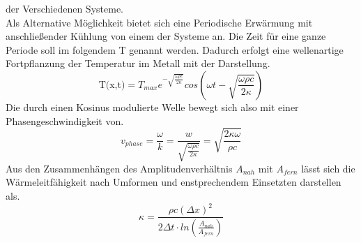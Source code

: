 der Verschiedenen Systeme.
\\
\newline
Als Alternative Möglichkeit bietet sich eine Periodische Erwärmung mit anschließender Kühlung von einem der Systeme an.
Die Zeit für eine ganze Periode soll im folgendem T genannt werden.
Dadurch erfolgt eine wellenartige Fortpflanzung der Temperatur im Metall mit der Darstellung.
\begin{equation}
    \label{eqn:nqe}
    \text{T(x,t)}=T_{max}e^{- \sqrt{\frac{\omega \rho c}{2 \kappa}}}cos \left (\omega t - \sqrt{\frac{\omega \rho c}{2 \kappa}} \right)
\end{equation}
Die durch einen Kosinus modulierte Welle bewegt sich also mit einer Phasengeschwindigkeit von.
\begin{equation}
    \label{eqn:v}
    v_{phase}= \frac{\omega}{k} = \frac{w}{\sqrt{\frac{\omega \rho c}{2 \kappa}}} = \sqrt{\frac{2\kappa \omega}{\rho c}}
\end{equation}
Aus den Zusammenhängen des Amplitudenverhältnis $A_{nah}$ mit $A_{fern}$ lässt sich die Wärmeleitfähigkeit nach Umformen
und enstprechendem Einsetzten darstellen als.
\begin{equation}
    \label{eqn:kappa}
    \kappa = \frac{\rho c \left ( \Delta x \right )^2}{2 \Delta t \cdot ln \left (\frac{A_{nah}}{A_{fern}}\right)}
\end{equation}